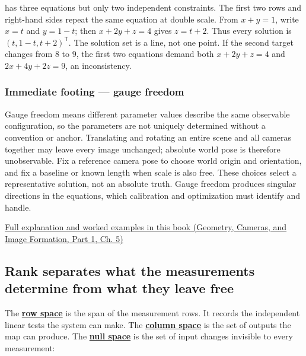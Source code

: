 has three equations but only two independent constraints. The first two rows and right-hand sides repeat the same equation at double scale. From \(x+y=1\), write \(x=t\) and \(y=1-t\); then \(x+2y+z=4\) gives \(z=t+2\). Thus every solution is \((t,1-t,t+2)^\mathsf T\). The solution set is a line, not one point. If the second target changes from \(8\) to \(9\), the first two equations demand both \(x+2y+z=4\) and \(2x+4y+2z=9\), an inconsistency.

\subsubsection{Immediate footing --- gauge freedom}\label{01-foundations-i-ch019-immediate-footing-gauge-freedom}

\hypertarget{01-foundations-i-ch019-immediate-footing-gauge-freedom}{}

Gauge freedom means different parameter values describe the same observable configuration, so the parameters are not uniquely determined without a convention or anchor. Translating and rotating an entire scene and all cameras together may leave every image unchanged; absolute world pose is therefore unobservable. Fix a reference camera pose to choose world origin and orientation, and fix a baseline or known length when scale is also free. These choices select a representative solution, not an absolute truth. Gauge freedom produces singular directions in the equations, which calibration and optimization must identify and handle.

\href{../03-Geometry-Cameras-and-Image-Formation-P01/main.pdf\#nameddest=02-foundations-ii-ch036-calibration-needs-informative-observations-and-a-fixed-gauge}{Full explanation and worked examples in this book (Geometry, Cameras, and Image Formation, Part 1, Ch. 5)}

\subsection{Rank separates what the measurements determine from what they leave free}\label{01-foundations-i-ch019-rank-separates-what-the-measurements-determine-from-what-they-leave-free}

\hypertarget{01-foundations-i-ch019-rank-separates-what-the-measurements-determine-from-what-they-leave-free}{}

The \textbf{\hyperref[01-foundations-i-ch019-a-system-is-an-intersection-of-constraints]{row space}} is the span of the measurement rows. It records the independent linear tests the system can make. The \textbf{\hyperref[01-foundations-i-ch019-a-system-is-an-intersection-of-constraints]{column space}} is the set of outputs the map can produce. The \textbf{\hyperref[01-foundations-i-ch019-a-system-is-an-intersection-of-constraints]{null space}} is the set of input changes invisible to every measurement:

